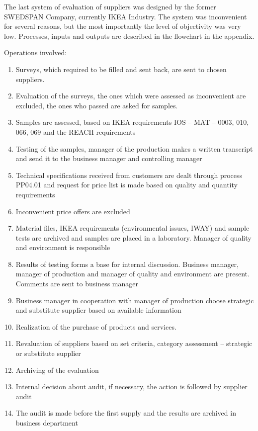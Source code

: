 \documentclass[oneside,12pt]{article}%
\begin{document}
The last system of evaluation of suppliers was designed by the former SWEDSPAN Company, currently IKEA Industry. The system was inconvenient for several reasons, but the most importantly the level of objectivity was very low. Processes, inputs and outputs are described in the flowchart in the appendix.

Operations involved:

\begin{enumerate}
  \item Surveys, which required to be filled and sent back, are sent to chosen suppliers.
  \item Evaluation of the surveys, the ones which were assessed as inconvenient are excluded, the ones who passed are asked for samples.
  \item Samples are assessed, based on IKEA requirements IOS – MAT – 0003, 010, 066, 069  and the REACH requirements
  \item Testing of the samples, manager of the production makes a written transcript and send it to the business manager and controlling manager
  \item Technical specifications received from customers are dealt through process PP04.01 and request for price list is made based on quality and quantity requirements
  \item   Inconvenient price offers are excluded
  \item Material files, IKEA requirements (environmental issues, IWAY) and sample tests are archived and samples are placed in a laboratory. Manager of quality and environment is responsible
  \item Results of testing forms a base for internal discussion. Business manager, manager of production and manager of quality and environment are present. Comments are sent to business manager
  \item Business manager in cooperation with manager of production choose strategic and substitute supplier based on available information
  \item Realization of the purchase of products and services.
  \item Revaluation of suppliers based on set criteria, category assessment – strategic or substitute supplier
  \item Archiving of the evaluation
  \item Internal decision about audit, if necessary, the action is followed by supplier audit
  \item The audit is made before the first supply and the results are archived in business department

\end{enumerate}
\end{document}
